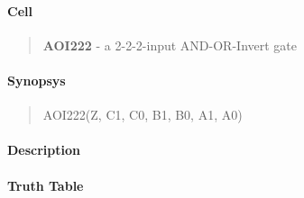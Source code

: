 \label{AOI222}
\paragraph{Cell}
\begin{quote}
    \textbf{AOI222} - a 2-2-2-input AND-OR-Invert gate
\end{quote}

\paragraph{Synopsys}
\begin{quote}
    AOI222(Z, C1, C0, B1, B0, A1, A0)
\end{quote}

\paragraph{Description}

%

\paragraph{Truth Table}


